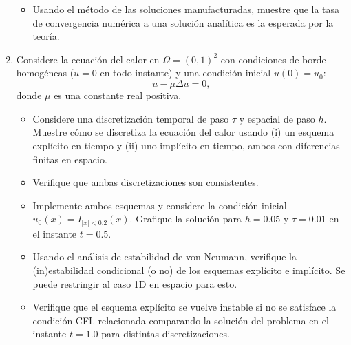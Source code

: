\documentclass{article}
\newcommand{\pts}[1]{[{\bf #1 puntos}]}
\begin{document}
\begin{enumerate}
\begin{itemize}
                \item\pts{2} Usando el método de las soluciones manufacturadas, muestre que la tasa de convergencia numérica a una solución analítica es la esperada por la teoría. 
            \end{itemize}
    \item Considere la ecuación del calor en $\Omega = (0,1)^2$ con condiciones de borde homogéneas ($u=0$ en todo instante) y una condición inicial $u(0)=u_0$:
            $$ \dot u - \mu \Delta u = 0 , $$
            donde $\mu$ es una constante real positiva.
            \begin{itemize}
                \item\pts{1} Considere una discretización temporal de paso $\tau$ y espacial de paso $h$. Muestre cómo se discretiza la ecuación del calor usando (i) un esquema explícito en tiempo y (ii) uno implícito en tiempo, ambos con diferencias finitas en espacio.
                \item\pts{2} Verifique que ambas discretizaciones son consistentes. 
                \item\pts{3} Implemente ambos esquemas y considere la condición inicial $u_0(x) = I_{|x| < 0.2}(x)$. Grafique la solución para $h=0.05$ y $\tau=0.01$ en el instante $t=0.5$. 
                \item\pts{2} Usando el análisis de estabilidad de von Neumann, verifique la (in)estabilidad condicional (o no) de los esquemas explícito e implícito. Se puede restringir al caso 1D en espacio para esto. 
                \item\pts{2} Verifique que el esquema explícito se vuelve instable si no se satisface la condición CFL relacionada comparando la solución del problema en el instante $t=1.0$ para distintas discretizaciones.
            \end{itemize}
\end{enumerate}

\end{document}
